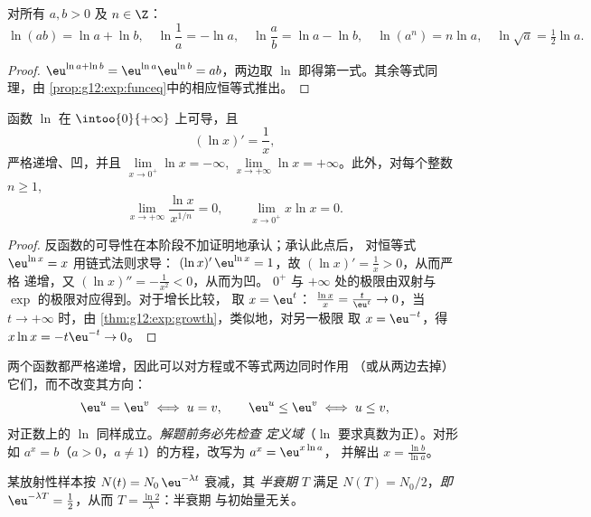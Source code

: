 \begin{proposition}[代数性质]\label{prop:g12:exp:lnalg}
对所有 $a, b > 0$ 及 $n \in \Z$：
\[
\ln(ab) = \ln a + \ln b, \quad
\ln\frac{1}{a} = -\ln a, \quad
\ln\frac{a}{b} = \ln a - \ln b, \quad
\ln(a^n) = n \ln a, \quad
\ln\sqrt{a} = \tfrac12 \ln a .
\]
\end{proposition}

\begin{proof}
$\eu^{\ln a + \ln b} = \eu^{\ln a}\eu^{\ln b} = ab$，两边取 $\ln$
即得第一式。其余等式同理，由
\cref{prop:g12:exp:funceq}中的相应恒等式推出。
\end{proof}

\begin{proposition}[分析性质]\label{prop:g12:exp:lnanalytic}
函数 $\ln$ 在 $\intoo{0}{+\infty}$ 上可导，且
\[
(\ln x)' = \frac{1}{x},
\]
严格递增、凹，并且
$\lim\limits_{x\to0^+} \ln x = -\infty$,
$\lim\limits_{x\to+\infty} \ln x = +\infty$。此外，对每个整数
$n \geq 1$,
\[
\lim_{x\to+\infty} \frac{\ln x}{x^{1/n}} = 0, \qquad
\lim_{x\to0^+} x \ln x = 0 .
\]
\end{proposition}

\begin{proof}
反函数的可导性在本阶段不加证明地承认；承认此点后，
对恒等式 $\eu^{\ln x} = x$ 用链式法则求导：
$(\ln x)'\,\eu^{\ln x} = 1$，故 $(\ln x)' = \frac{1}{x} > 0$，从而严格
递增，又 $(\ln x)'' = -\frac1{x^2} < 0$，从而为凹。
$0^+$ 与 $+\infty$ 处的极限由双射与 $\exp$ 的极限对应得到。对于增长比较，
取 $x = \eu^{t}$：
$\frac{\ln x}{x} = \frac{t}{\eu^t} \to 0$，当 $t \to +\infty$ 时，由
\cref{thm:g12:exp:growth}，类似地，对另一极限
取 $x = \eu^{-t}$，得 $x\ln x = -t\eu^{-t} \to 0$。
\end{proof}

\begin{method}\label{met:g12:exp:equations}
两个函数都严格递增，因此可以对方程或不等式两边同时作用
（或从两边去掉）它们，而不改变其方向：
\[
\eu^{u} = \eu^{v} \iff u = v, \qquad
\eu^{u} \leq \eu^{v} \iff u \leq v,
\]
对正数上的 $\ln$ 同样成立。\emph{解题前务必先检查
定义域}（$\ln$ 要求真数为正）。对形如
$a^x = b$（$a>0$，$a \neq 1$）的方程，改写为 $a^x = \eu^{x\ln a}$，
并解出 $x = \frac{\ln b}{\ln a}$。
\end{method}

\begin{example}\label{ex:g12:exp:halflife}
某放射性样本按 $N(t) = N_0\,\eu^{-\lambda t}$ 衰减，其
\emph{半衰期} $T$ 满足 $N(T) = N_0/2$，\emph{即}
$\eu^{-\lambda T} = \frac12$，从而 $T = \frac{\ln 2}{\lambda}$：半衰期
与初始量无关。
\end{example}

